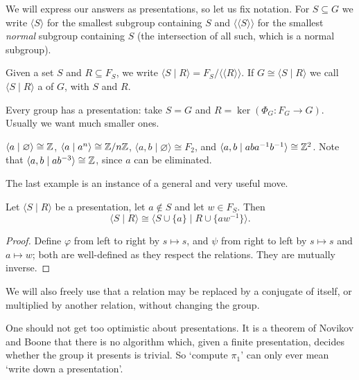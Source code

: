 \documentclass[a4paper]{scrartcl}
\newcommand{\genby}[1]{\langle #1 \rangle}
\newcommand{\ngenby}[1]{\langle\!\langle #1 \rangle\!\rangle}
\begin{document}
We will express our answers as presentations, so let us fix notation. For $S \subseteq G$
we write $\genby{S}$ for the smallest subgroup containing $S$ and $\ngenby{S}$ for the
smallest \emph{normal} subgroup containing $S$ (the intersection of all such, which is a
normal subgroup).

\begin{definition}[Presentation]
	Given a set $S$ and $R \subseteq F_S$, we write $\genby{S \mid R} = F_S / \ngenby{R}$. If $G \cong \genby{S\mid R}$ we call $\genby{S\mid R}$ a  of $G$, with  $S$ and  $R$.
\end{definition}

Every group has a presentation: take $S = G$ and $R = \ker(\Phi_G: F_G \to G)$. Usually we
want much smaller ones.

\begin{example}
	$\genby{a \mid \varnothing} \cong \Z$, $\genby{a \mid a^n} \cong \Z/n\Z$, $\genby{a, b \mid \varnothing} \cong F_2$, and $\genby{a,b \mid aba^{-1}b^{-1}} \cong \Z^2$. Note that $\genby{a,b\mid ab^{-3}} \cong \Z$, since $a$ can be eliminated.
\end{example}

The last example is an instance of a general and very useful move.

\begin{proposition} \label{prop:tietze}
	Let $\genby{S \mid R}$ be a presentation, let $a \notin S$ and let $w \in F_S$. Then
	$$
	\genby{S \mid R} \cong \genby{S \cup \{a\} \mid R \cup \{aw^{-1}\}}.
	$$
\end{proposition}
\begin{proof}
	Define $\varphi$ from left to right by $s \mapsto s$, and $\psi$ from right to left by $s \mapsto s$ and $a \mapsto w$; both are well-defined as they respect the relations. They are mutually inverse.
\end{proof}

We will also freely use that a relation may be replaced by a conjugate of itself, or
multiplied by another relation, without changing the group.

\begin{remark}
	One should not get too optimistic about presentations. It is a theorem of Novikov and Boone that there is no algorithm which, given a finite presentation, decides whether the group it presents is trivial. So `compute $\pi_1$' can only ever mean `write down a presentation'.
\end{remark}
\end{document}
